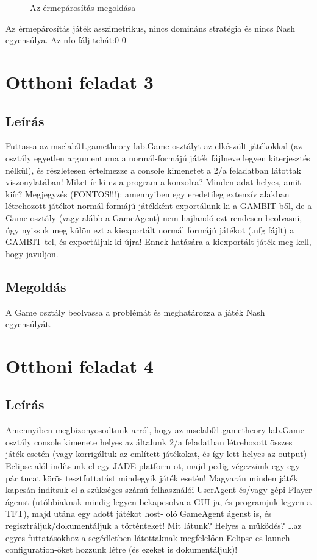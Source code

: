 \begin{itemize}
\begin{figure}[!h]
\begin{center}
		\caption{Az érmepárosítás megoldása}
		\end{center}
		\end{figure}
Az érmepárosítás játék asszimetrikus, nincs domináns stratégia és nincs Nash egyensúlya.
Az nfo fálj tehát:0	0
\end{itemize}

\section{Otthoni feladat 3}
\subsection{Leírás}
Futtassa az msclab01.gametheory-lab.Game osztályt az elkészült játékokkal (az osztály egyetlen argumentuma a normál-formájú játék fájlneve legyen kiterjesztés nélkül), és részletesen értelmezze a console kimenetet a 2/a feladatban látottak viszonylatában! Miket ír ki ez a program a konzolra? Minden adat helyes, amit kiír? Megjegyzés (FONTOS!!!): amennyiben egy eredetileg extenzív alakban létrehozott játékot normál formájú játékként exportálunk ki a GAMBIT-ből, de a Game osztály (vagy alább a GameAgent) nem hajlandó ezt rendesen beolvasni, úgy nyissuk meg külön ezt a kiexportált normál formájú játékot (.nfg fájlt) a GAMBIT-tel, és exportáljuk ki újra! Ennek hatására a kiexportált játék meg kell, hogy javuljon.  
\subsection{Megoldás}
A Game osztály beolvassa a problémát és meghatározza a játék Nash egyensúlyát.


\section{Otthoni feladat 4}
\subsection{Leírás}
Amennyiben megbizonyosodtunk arról, hogy az msclab01.gametheory-lab.Game osztály console kimenete helyes az általunk 2/a feladatban létrehozott összes játék esetén (vagy korrigáltuk az említett játékokat, és így lett helyes az output) Eclipse alól indítsunk el egy JADE platform-ot, majd pedig végezzünk egy-egy pár tucat körös tesztfuttatást mindegyik játék esetén! Magyarán minden játék kapcsán indítsuk el a szükséges számú felhasználói UserAgent és/vagy gépi Player ágenst (utóbbiaknak mindig legyen bekapcsolva a GUI-ja, és programjuk legyen a TFT), majd utána egy adott játékot host- oló GameAgent ágenst is, és regisztráljuk/dokumentáljuk a történteket! Mit látunk? Helyes a működés? …az egyes futtatásokhoz a segédletben látottaknak megfelelően Eclipse-es launch configuration-őket hozzunk létre (és ezeket is dokumentáljuk)! 
